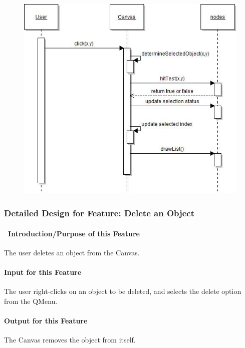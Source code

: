 \documentclass[twoside,letterpaper]{article}
\begin{document}
{\begin{figure}[h]
\centering
\includegraphics[width=5.0in]{IntSelectObj.jpg}
\end{figure}

\clearpage



 

\subsubsection{Detailed Design for Feature: Delete an Object}

\paragraph[\ Introduction/Purpose of this Feature]
{\ Introduction/Purpose of this Feature}
{\color{black}
The user deletes an object from the Canvas.
}

\paragraph[Input for this Feature]{Input for this Feature}
{\color{black}
The user right-clicks on an object to be deleted, and selects the delete option from the QMenu.
}

\paragraph{Output for this Feature}
{\color{black}
The Canvas removes the object from itself.
}

}
\end{document}
